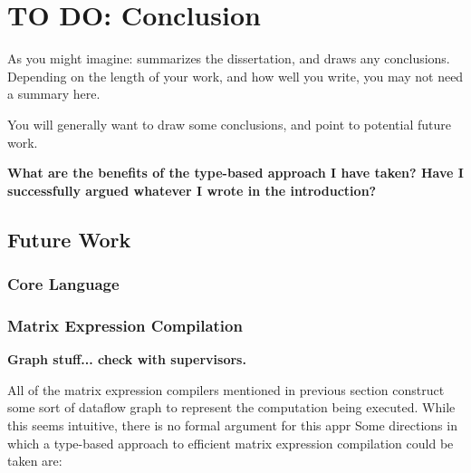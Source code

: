 \chapter{TO DO: Conclusion}

\begin{guidance}
    As you might imagine: summarizes the dissertation, and draws
    any conclusions. Depending on the length of your work, and
    how well you write, you may not need a summary here.

    You will generally want to draw some conclusions, and point
    to potential future work.
\end{guidance}

\textbf{What are the benefits of the type-based approach I have taken? Have I successfully 
argued whatever I wrote in the introduction?}

\section{Future Work}


\subsection{Core Language}

\subsection{Matrix Expression Compilation}

\textbf{Graph stuff... check with supervisors.}

All of the matrix expression compilers mentioned in previous section construct
some sort of dataflow graph to represent the computation being executed. While
this seems intuitive, there is no formal argument for this  appr
Some directions in which a type-based approach to efficient matrix expression compilation could
be taken are:

